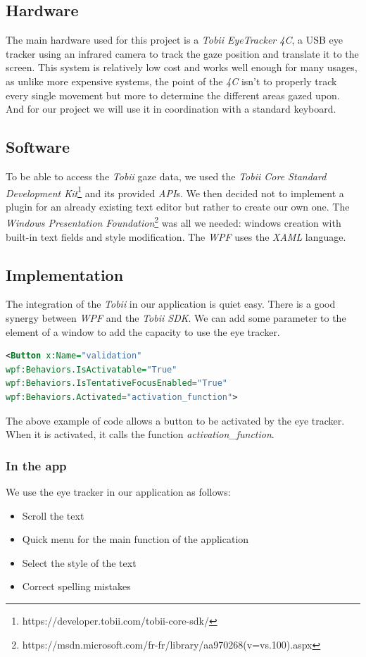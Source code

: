 \documentclass[12pt, a4paper]{article}
\begin{document}
\subsection{Hardware} \label{hardware}
The main hardware used for this project is a \textit{Tobii EyeTracker 4C}, a USB eye tracker using an infrared camera to track the gaze position and translate it to the screen. This system is relatively low cost and works well enough for many usages, as unlike more expensive systems, the point of the \textit{4C} isn't to properly track every single movement but more to determine the different areas gazed upon. 
And for our project we will use it in coordination with a standard keyboard.

\subsection{Software}
To be able to access the \textit{Tobii} gaze data, we used the \textit{Tobii Core Standard Development Kit}\footnote{https://developer.tobii.com/tobii-core-sdk/} and its provided \textit{API}s. We then decided not to implement a plugin for an already existing text editor but rather to create our own one. The \textit{Windows Presentation Foundation}\footnote{https://msdn.microsoft.com/fr-fr/library/aa970268(v=vs.100).aspx} was all we needed: windows creation with built-in text fields and style modification. The \textit{WPF} uses the \textit{XAML} language. 

\subsection{Implementation}
The integration of the \textit{Tobii} in our application is quiet easy. There is a good synergy between \textit{WPF} and the \textit{Tobii SDK}. We can add some parameter to the element of a window to add the capacity to use the eye tracker.

\begin{lstlisting}[frame=single, language=XML]
<Button x:Name="validation"
wpf:Behaviors.IsActivatable="True"
wpf:Behaviors.IsTentativeFocusEnabled="True"
wpf:Behaviors.Activated="activation_function">
\end{lstlisting}

The above example of code allows a button to be activated by the eye tracker. When it is activated, it calls the function \textit{activation\_function}.

\subsubsection{In the app}
We use the eye tracker in our application as follows:
\begin{itemize}
\item Scroll the text
\item Quick menu for the main function of the application
\item Select the style of the text
\item Correct spelling mistakes
\end{itemize}
\end{document}
